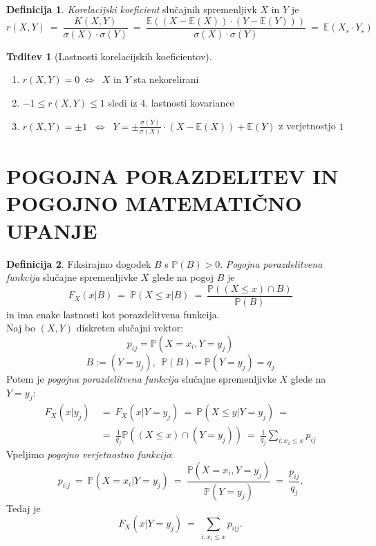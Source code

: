 \documentclass[11pt]{article}
\theoremstyle{definition}
\newtheorem{definicija}{Definicija}[section]
\theoremstyle{definition}
\newtheorem{trditev}{Trditev}[section]
\theoremstyle{definition}
\begin{document}
\begin{definicija}

\textit{Korelacijski koeficient} slučajnih spremenljivk $X$ in $Y$ je
$$r(X,Y) ~=~ \frac{K(X, Y)}{\sigma(X) \cdot \sigma(Y)} ~=~ \frac{\mathbb{E}((X - \mathbb{E}(X)) \cdot (Y - \mathbb{E}(Y)))}{\sigma(X) \cdot \sigma(Y)} ~=~ \mathbb{E}(X_s \cdot Y_s)$$

\end{definicija}
\vspace{0.5cm}

\begin{trditev}[Lastnosti korelacijskih koeficientov]
~\\
\begin{enumerate}
	\item $r(X,Y) = 0 ~\Leftrightarrow~$ $X$ in $Y$ sta nekorelirani
	\item $-1 \leq r(X,Y) \leq 1$ sledi iz 4. lastnosti kovariance
	\item $r(X,Y) = \pm 1$ $~\Leftrightarrow~$ $Y = \pm \frac{\sigma(Y)}{\sigma(X)} \cdot (X - \mathbb{E}(X)) + \mathbb{E}(Y)$ z verjetnostjo $1$
\end{enumerate}
\end{trditev}
\vspace{0.5cm}

\pagebreak


\section{POGOJNA PORAZDELITEV IN POGOJNO MATEMATIČNO UPANJE}
\vspace{0.5cm}

\begin{definicija}

Fiksirajmo dogodek $B$ s $\mathbb{P}(B) > 0$. \textit{Pogojna porazdelitvena funkcija} slučajne spremenljivke $X$ glede na pogoj $B$ je
$$F_X(x | B) ~=~ \mathbb{P}(X \leq x | B) ~=~ \frac{\mathbb{P}((X \leq x) \cap B)}{\mathbb{P}(B)}$$
in ima enake lastnosti kot porazdelitvena funkcija. \\

\noindent Naj bo $(X, Y)$ diskreten slučajni vektor: 
$$p_{ij} =  \mathbb{P}(X = x_i, Y = y_j)$$
$$B := (Y = y_j), ~~\mathbb{P}(B) = \mathbb{P}(Y = y_j) = q_j$$
Potem je \textit{pogojna porazdelitvena funkcija} slučajne spremenljivke $X$ glede na $Y = y_j$:
\begin{align*}
	F_X(x | y_j) ~&=~ F_X(x | Y = y_j) ~=~ \mathbb{P}(X \leq y |Y = y_j) ~= \\
	&=~ \frac{1}{q_j} \mathbb{P}((X \leq x) \cap (Y = y_j)) ~=~ \frac{1}{q_j} \sum_{i: x_1 \leq x} p_{ij}
\end{align*}
Vpeljimo  \textit{pogojno verjetnostno funkcijo}:
$$p_{i|j} ~=~ \mathbb{P}(X = x_i | Y = y_j) ~=~ \frac{\mathbb{P}(X = x_i, Y = y_j)}{\mathbb{P}(Y = y_j)} ~=~ \frac{p_{ij}}{q_j}.$$
Tedaj je 
$$F_X(x | Y = y_j) ~=~ \sum_{i: x_i \leq x} p_{i|j}.$$

\end{definicija}
\vspace{0.5cm}
\end{document}
